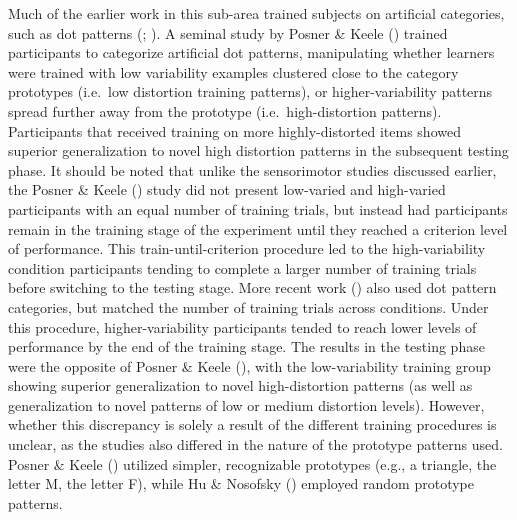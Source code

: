 \documentclass[
  11pt,
  letterpaper,
]{article}
\begin{document}
Much of the earlier work in this sub-area trained subjects on artificial
categories, such as dot patterns
(; ). A seminal study by Posner \& Keele
() trained
participants to categorize artificial dot patterns, manipulating whether
learners were trained with low variability examples clustered close to
the category prototypes (i.e.~low distortion training patterns), or
higher-variability patterns spread further away from the prototype
(i.e.~high-distortion patterns). Participants that received training on
more highly-distorted items showed superior generalization to novel high
distortion patterns in the subsequent testing phase. It should be noted
that unlike the sensorimotor studies discussed earlier, the Posner \&
Keele () study did
not present low-varied and high-varied participants with an equal number
of training trials, but instead had participants remain in the training
stage of the experiment until they reached a criterion level of
performance. This train-until-criterion procedure led to the
high-variability condition participants tending to complete a larger
number of training trials before switching to the testing stage. More
recent work () also used dot pattern categories, but matched the
number of training trials across conditions. Under this procedure,
higher-variability participants tended to reach lower levels of
performance by the end of the training stage. The results in the testing
phase were the opposite of Posner \& Keele
(), with the
low-variability training group showing superior generalization to novel
high-distortion patterns (as well as generalization to novel patterns of
low or medium distortion levels). However, whether this discrepancy is
solely a result of the different training procedures is unclear, as the
studies also differed in the nature of the prototype patterns used.
Posner \& Keele ()
utilized simpler, recognizable prototypes (e.g., a triangle, the letter
M, the letter F), while Hu \& Nosofsky
() employed random
prototype patterns.
\end{document}

